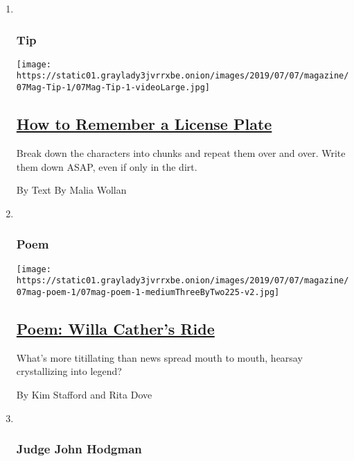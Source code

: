 \begin{enumerate}
\def\labelenumi{\arabic{enumi}.}
\item ~
  \hypertarget{tip}{%
  \subsubsection{Tip}\label{tip}}

  \texttt{[image: https://static01.graylady3jvrrxbe.onion/images/2019/07/07/magazine/07Mag-Tip-1/07Mag-Tip-1-videoLarge.jpg]}

  \hypertarget{how-to-remember-a-license-plate}{%
  \subsection{\texorpdfstring{\href{/2019/07/02/magazine/how-to-remember-a-license-plate.html}{How
  to Remember a License
  Plate}}{How to Remember a License Plate}}\label{how-to-remember-a-license-plate}}

  Break down the characters into chunks and repeat them over and over.
  Write them down ASAP, even if only in the dirt.

  By Text By Malia Wollan
\item ~
  \hypertarget{poem}{%
  \subsubsection{Poem}\label{poem}}

  \texttt{[image: https://static01.graylady3jvrrxbe.onion/images/2019/07/07/magazine/07mag-poem-1/07mag-poem-1-mediumThreeByTwo225-v2.jpg]}

  \hypertarget{poem-willa-cathers-ride}{%
  \subsection{\texorpdfstring{\href{/2019/07/08/magazine/poem-willa-cathers-ride.html}{Poem:
  Willa Cather's
  Ride}}{Poem: Willa Cather's Ride}}\label{poem-willa-cathers-ride}}

  What's more titillating than news spread mouth to mouth, hearsay
  crystallizing into legend?

  By Kim Stafford and Rita Dove
\item ~
  \hypertarget{judge-john-hodgman}{%
  \subsubsection{Judge John Hodgman}\label{judge-john-hodgman}}


\end{enumerate}
